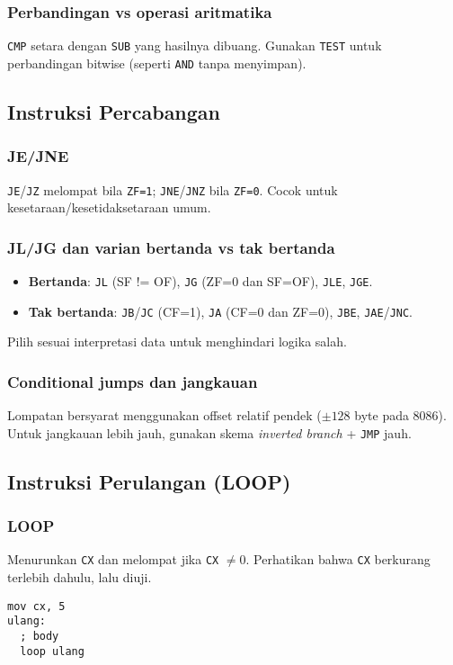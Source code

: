 \subsubsection{Perbandingan vs operasi aritmatika}
\texttt{CMP} setara dengan \texttt{SUB} yang hasilnya dibuang. Gunakan \texttt{TEST} untuk perbandingan bitwise (seperti \texttt{AND} tanpa menyimpan).

\subsection{Instruksi Percabangan}
\subsubsection{JE/JNE}
\texttt{JE}/\texttt{JZ} melompat bila \texttt{ZF=1}; \texttt{JNE}/\texttt{JNZ} bila \texttt{ZF=0}. Cocok untuk kesetaraan/kesetidaksetaraan umum.

\subsubsection{JL/JG dan varian bertanda vs tak bertanda}
\begin{itemize}
  \item \textbf{Bertanda}: \texttt{JL} (SF != OF), \texttt{JG} (ZF=0 dan SF=OF), \texttt{JLE}, \texttt{JGE}.
  \item \textbf{Tak bertanda}: \texttt{JB}/\texttt{JC} (CF=1), \texttt{JA} (CF=0 dan ZF=0), \texttt{JBE}, \texttt{JAE}/\texttt{JNC}.
\end{itemize}
Pilih sesuai interpretasi data untuk menghindari logika salah.

\subsubsection{Conditional jumps dan jangkauan}
Lompatan bersyarat menggunakan offset relatif pendek (\(\pm 128\) byte pada 8086). Untuk jangkauan lebih jauh, gunakan skema \textit{inverted branch} + \texttt{JMP} jauh.

\subsection{Instruksi Perulangan (LOOP)}
\subsubsection{LOOP}
Menurunkan \texttt{CX} dan melompat jika \texttt{CX} \(\neq 0\). Perhatikan bahwa \texttt{CX} berkurang terlebih dahulu, lalu diuji.
\begin{verbatim}
mov cx, 5
ulang:
  ; body
  loop ulang
\end{verbatim}

